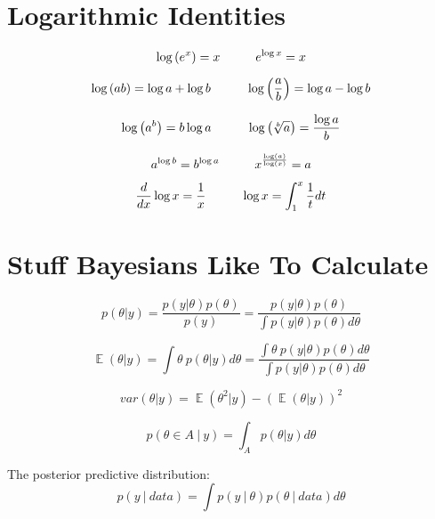 \documentclass[12pt]{article}
\DeclareMathOperator*{\E}{\mathbb{E}}
\begin{document}
\section*{Logarithmic Identities}

\begin{equation*}
\log{\left( e^x \right)} = x \hspace{10mm} e^{\log{x}} = x
\end{equation*}

\begin{equation*}
\log{\left(  ab \right)} = \log a + \log b \hspace{10mm}  \log{\left(\frac{a}{b} \right)} = \log a - \log b
\end{equation*}

\begin{equation*}
\log{\left(  a^b \right)} = b\log a \hspace{10mm}  \log{\left(\sqrt[b]{a} \right)} = \frac{\log{a}}{b}
\end{equation*}

\begin{equation*}
a^{\log{b}} = b^{\log{a}}  \hspace{10mm}  x^{\frac{\log(a)}{\log(x)}} = a
\end{equation*}

\begin{equation*}
{d \over dx} \log x = {1 \over x } \hspace{10mm} \log x = \int_1^x \frac {1}{t} dt
\end{equation*}

\section*{Stuff Bayesians Like To Calculate}

\begin{equation*}
p(\theta | y) 
=  \frac{p(y | \theta) p(\theta)}{p(y)} 
=  \frac{p(y | \theta) p(\theta)}{\int p(y | \theta)p(\theta)d\theta} 
\end{equation*}

\begin{equation*}
\E (\theta | y) =  \int \theta\ p(\theta| y)d\theta = \frac{\int \theta\ p(y|\theta)p(\theta)d\theta}{\int p(y|\theta)p(\theta)d\theta}
\end{equation*}

\begin{equation*}
var (\theta | y) = \E (\theta^2 | y) - \left(\E(\theta | y)\right)^2
\end{equation*}

\begin{equation*}
p(\theta \in A \ | \ y) = \int_{A} p(\theta | y)d\theta
\end{equation*}

The posterior predictive distribution:
\begin{equation*}
p(y \ | \ data) = \int p(y\ |\ \theta) p(\theta\ |\ data) d\theta
\end{equation*}
\end{document}
